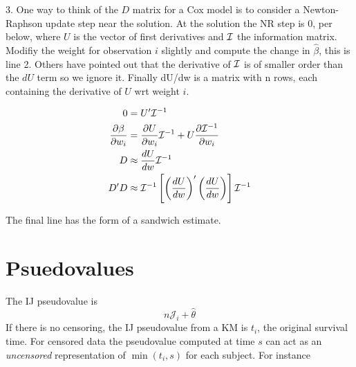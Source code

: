 \documentclass{article}\usepackage[]{graphicx}\usepackage[]{xcolor}
\newcommand{\Cvar}{{\cal I}^{-1}}
\begin{document}
3. One way to think of the $D$ matrix for a Cox model is to consider a
Newton-Raphson update step near the solution.
At the solution the NR step is 0, per below, where $U$ is the vector of
first derivatives and $\cal I$ the information matrix.
Modifiy the weight for observation $i$ slightly and compute the change in
$\hat\beta$, this is line 2. 
Others have pointed out that the derivative of $\cal I$ is of smaller order than
the $dU$ term so we ignore it.
 Finally dU/dw is a matrix with
n rows, each containing the derivative of $U$ wrt weight $i$.

\begin{align*}
  0 &= U' \Cvar \\
  \frac{\partial \beta}{\partial w_i} &= \frac{\partial U}{\partial w_i} \Cvar +
  U \frac{\partial\Cvar}{\partial w_i} \\
  D & \approx \frac{dU}{dw} \Cvar \\
  D'D &\approx \Cvar \left[ \left(\frac{dU}{dw}\right)'\left(\frac{dU}{dw}
    \right) \right] \Cvar
\end{align*}

The final line has the form of a sandwich estimate.  

\section{Psuedovalues}
The IJ pseudovalue is
$$
 n \mathcal{J}_i + \hat\theta
$$
If there is no censoring, the IJ pseudovalue from a KM is $t_i$, the original
survival time.
For censored data the pseudovalue computed at time $s$ can act as an 
\emph{uncensored} representation of $\min(t_i, s)$ for each subject.
For instance
\end{document}
